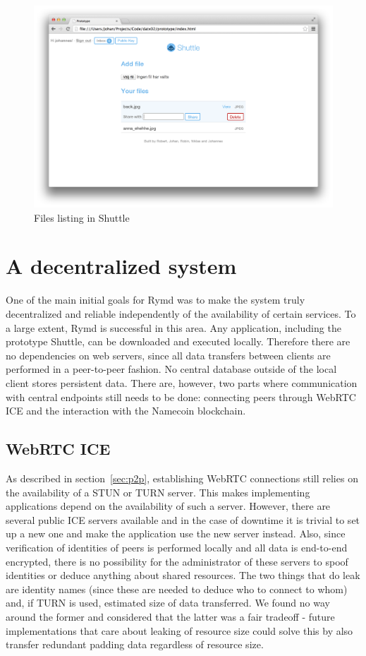 \begin{figure}[ht]
\centering
\includegraphics[width=\textwidth,height=0.2\paperheight,keepaspectratio
]{figures/shuttle-files}
\caption{Files listing in Shuttle}
\label{fig:shuttle-files}
\end{figure}

\section{A decentralized system}
One of the main initial goals for Rymd was to make the system truly decentralized and reliable independently of the availability of certain services. To a large extent, Rymd is successful in this area. Any application, including the prototype Shuttle, can be downloaded and executed locally. Therefore there are no dependencies on web servers, since all data transfers between clients are performed in a peer-to-peer fashion. No central database outside of the local client stores persistent data. There are, however, two parts where communication with central endpoints still needs to be done: connecting peers through WebRTC ICE and the interaction with the Namecoin blockchain.

\subsection{WebRTC ICE}
As described in section~\ref{sec:p2p}, establishing WebRTC connections still relies on the availability of a STUN or TURN server. This makes implementing applications depend on the availability of such a server. However, there are several public ICE servers available and in the case of downtime it is trivial to set up a new one and make the application use the new server instead. Also, since verification of identities of peers is performed locally and all data is end-to-end encrypted, there is no possibility for the administrator of these servers to spoof identities or deduce anything about shared resources. The two things that do leak are identity names (since these are needed to deduce who to connect to whom) and, if TURN is used, estimated size of data transferred. We found no way around the former and considered that the latter was a fair tradeoff - future implementations that care about leaking of resource size could solve this by also transfer redundant padding data regardless of resource size.

